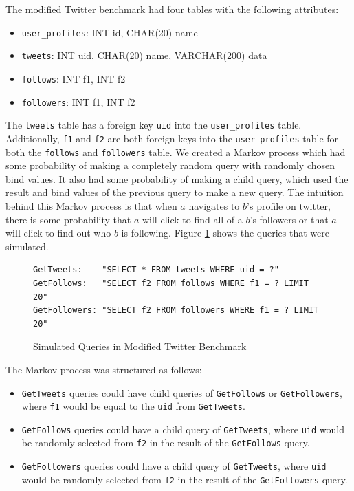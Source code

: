 \documentclass[12pt]{article}
\begin{document}
The modified Twitter benchmark had four tables with the following attributes:

\begin{itemize}
  \item \texttt{user\_profiles}: INT id, CHAR(20) name
  \item \texttt{tweets}: INT uid, CHAR(20) name, VARCHAR(200) data
  \item \texttt{follows}: INT f1, INT f2
  \item \texttt{followers}: INT f1, INT f2
\end{itemize}

The \texttt{tweets} table has a foreign key \texttt{uid} into the \texttt{user\_profiles} table. Additionally, \texttt{f1} and \texttt{f2} are both foreign keys into the \texttt{user\_profiles} table for both the \texttt{follows} and \texttt{followers} table. We created a Markov process which had some probability of making a completely random query with randomly chosen bind values. It also had some probability of making a child query, which used the result and bind values of the previous query to make a new query. The intuition behind this Markov process is that when $a$ navigates to $b$'s profile on twitter, there is some probability that $a$ will click to find all of a $b$'s followers or that $a$ will click to find out who $b$ is following. Figure \ref{fig:queries-simulated} shows the queries that were simulated.

\begin{figure}[h]
\begin{lstlisting}[frame=single]
GetTweets:    "SELECT * FROM tweets WHERE uid = ?"
GetFollows:   "SELECT f2 FROM follows WHERE f1 = ? LIMIT 20"
GetFollowers: "SELECT f2 FROM followers WHERE f1 = ? LIMIT 20"
\end{lstlisting}
\caption{\label{fig:queries-simulated}Simulated Queries in Modified Twitter Benchmark}
\end{figure}

The Markov process was structured as follows:
\begin{itemize}
  \item \texttt{GetTweets} queries could have child queries of \texttt{GetFollows} or \texttt{GetFollowers}, where \texttt{f1} would be equal to the \texttt{uid} from \texttt{GetTweets}.
  \item \texttt{GetFollows} queries could have a child query of \texttt{GetTweets}, where \texttt{uid} would be randomly selected from \texttt{f2} in the result of the \texttt{GetFollows} query.
  \item \texttt{GetFollowers} queries could have a child query of \texttt{GetTweets}, where \texttt{uid} would be randomly selected from \texttt{f2} in the result of the \texttt{GetFollowers} query.
\end{itemize}
\end{document}
